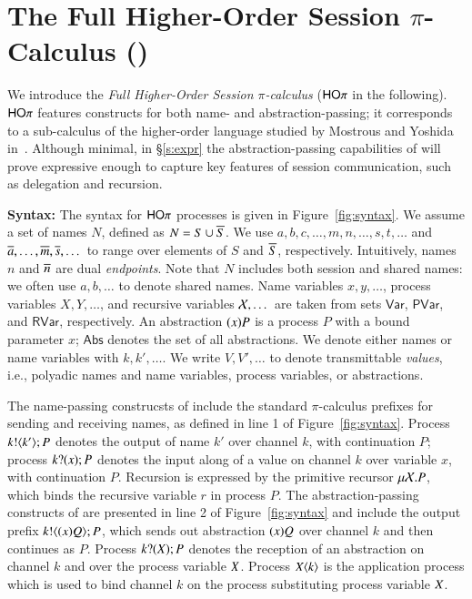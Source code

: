 
\section{The Full Higher-Order Session $\pi$-Calculus (\HOp)}

We introduce the {\em Full Higher-Order Session $\pi$-calculus}
($\mathsf{HO}\pi$ in the following).
$\mathsf{HO}\pi$ features constructs for both name- and abstraction-passing;
it corresponds to a sub-calculus 
of the higher-order language studied by Mostrous and Yoshida in~\cite{tlca07}.
Although minimal, in \S\ref{s:expr}
the abstraction-passing capabilities of \HOp will prove 
expressive enough to capture key features of session communication, 
such as delegation and recursion.

{\bf Syntax:}
The syntax for $\mathsf{HO}\pi$ processes is given in Figure~\ref{fig:syntax}.
We assume a set of names $N$, defined as $N = S \cup \overline{S}$.
We use $a,b,c, \dots, m, n, \dots, s, t, \dots$ 
and $\overline{a}, \dots, \overline{m}, \overline{s}, \dots$
to range over elements of $S$ and $\overline{S}$, respectively.
Intuitively, names $n$ and $\overline{n}$ are dual \emph{endpoints}.
Note that $N$ includes both session and shared names:
we often use  $a,b, \dots$ to denote shared names.
Name variables $x, y,  \dots$, 
process variables $X, Y,  \dots$,
and recursive variables $\mathcal{X}, \dots$ 
are taken from sets $\mathsf{Var}$, $\mathsf{PVar}$, and $\mathsf{RVar}$, respectively. 
An abstraction $(x)P$ is a process $P$ with a bound parameter $x$;
$\mathsf{Abs}$ denotes the set of all abstractions.
We denote either names or name variables with $k, k', \dots$.
We write $V, V', \ldots$ to denote 
transmittable \emph{values}, i.e., 
polyadic names and name variables, process variables, or abstractions.

The name-passing construcsts of \HOp include the
standard $\pi$-calculus prefixes for sending and receiving names,
as defined in line 1 of Figure~\ref{fig:syntax}.
Process $k ! \langle k' \rangle ; P$ denotes the output of name $k'$ over channel $k$,
with continuation $P$;
process $k ? (x) ; P$ denotes the input along  of a value
on channel $k$ over variable $x$, with continuation $P$. 
Recursion is expressed by the primitive recursor $\mu \mathcal{X}. P$,
which binds the recursive variable $r$ in process $P$.
The abstraction-passing constructs of \HOp are presented in line
2 of Figure~\ref{fig:syntax} and include 
the output prefix $k ! \langle (x)Q \rangle ; P$, which 
sends out abstraction $(x)Q$ over channel $k$ and then continues as $P$. 
Process $k ? (X) ; P$ denotes the reception of an abstraction
on channel $k$ and over the process variable $X$.
Process $X\langle k \rangle$ is the application
process which is used to bind channel $k$ on the process
substituting process variable $X$.

